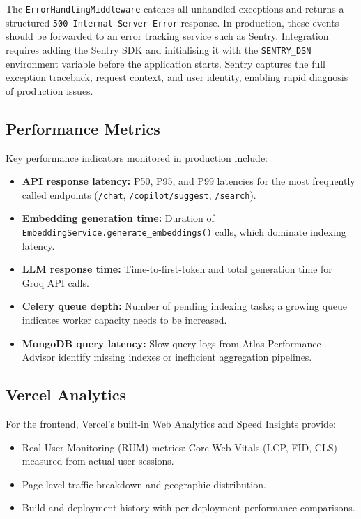 The \texttt{ErrorHandlingMiddleware} catches all unhandled exceptions and returns a structured \texttt{500 Internal Server Error} response. In production, these events should be forwarded to an error tracking service such as Sentry. Integration requires adding the Sentry SDK and initialising it with the \texttt{SENTRY\_DSN} environment variable before the application starts. Sentry captures the full exception traceback, request context, and user identity, enabling rapid diagnosis of production issues.

\subsection{Performance Metrics}

Key performance indicators monitored in production include:

\begin{itemize}
    \item \textbf{API response latency:} P50, P95, and P99 latencies for the most frequently called endpoints (\texttt{/chat}, \texttt{/copilot/suggest}, \texttt{/search}).
    \item \textbf{Embedding generation time:} Duration of \texttt{EmbeddingService.generate\_embeddings()} calls, which dominate indexing latency.
    \item \textbf{LLM response time:} Time-to-first-token and total generation time for Groq API calls.
    \item \textbf{Celery queue depth:} Number of pending indexing tasks; a growing queue indicates worker capacity needs to be increased.
    \item \textbf{MongoDB query latency:} Slow query logs from Atlas Performance Advisor identify missing indexes or inefficient aggregation pipelines.
\end{itemize}

\subsection{Vercel Analytics}

For the frontend, Vercel's built-in Web Analytics and Speed Insights provide:

\begin{itemize}
    \item Real User Monitoring (RUM) metrics: Core Web Vitals (LCP, FID, CLS) measured from actual user sessions.
    \item Page-level traffic breakdown and geographic distribution.
    \item Build and deployment history with per-deployment performance comparisons.
\end{itemize}

